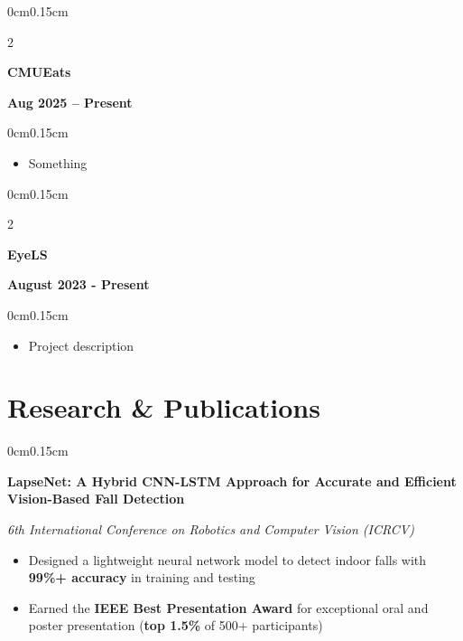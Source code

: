 \documentclass[10pt, letterpaper]{article}
\newenvironment{highlights}{
    \begin{itemize}[topsep=0pt, parsep=0pt, partopsep=0pt, itemsep=0pt, leftmargin=0.6cm]
}{
    \end{itemize}
}
\newenvironment{onecolentry}{
    \begin{adjustwidth}{0cm}{0.15cm}
}{
    \end{adjustwidth}
}
\newenvironment{twocolentry}[2][]{
    \onecolentry
    \def\secondColumn{#2}
    \setcolumnwidth{\fill, 4cm}
    \begin{paracol}{2}
}{
    \switchcolumn \raggedleft \secondColumn
    \end{paracol}
    \endonecolentry
}
\begin{document}
    \vspace{0.05cm}

    \begin{twocolentry}{\textbf{Aug 2025 -- Present}}
        \textbf{CMUEats}
    \end{twocolentry}
    \vspace{-0.1cm}
    \begin{onecolentry}
        \begin{highlights}
            \item Something
        \end{highlights}
    \end{onecolentry}

    \vspace{0.05cm}

    \begin{twocolentry}{\textbf{August 2023 - Present}}
        \textbf{EyeLS}
    \end{twocolentry}
    \vspace{-0.1cm}
    \begin{onecolentry}
        \begin{highlights}
            \item Project description
        \end{highlights}
    \end{onecolentry}

    \vspace{0.05cm}

    \section{Research \& Publications}
    \vspace{0.1cm}

    \begin{onecolentry}
        \textbf{LapseNet: A Hybrid CNN-LSTM Approach for Accurate and Efficient Vision-Based Fall Detection}
        
        \textit{6th International Conference on Robotics and Computer Vision (ICRCV)}
        \begin{highlights}
            \item Designed a lightweight neural network model to detect indoor falls with \textbf{99\%+ accuracy} in training and testing
            \item Earned the \textbf{IEEE Best Presentation Award} for exceptional oral and poster presentation (\textbf{top 1.5\%} of 500+ participants)
        \end{highlights}
    \end{onecolentry}
\end{document}
